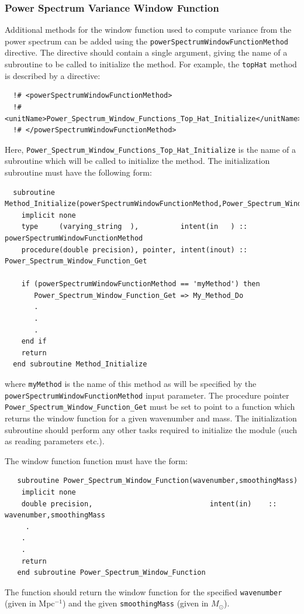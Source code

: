 \subsubsection{Power Spectrum Variance Window Function}

Additional methods for the window function used to compute variance from the power spectrum can be added using the {\tt powerSpectrumWindowFunctionMethod} directive. The directive should contain a single argument, giving the name of a subroutine to be called to initialize the method. For example, the {\tt topHat} method is described by a directive:
\begin{verbatim}
  !# <powerSpectrumWindowFunctionMethod>
  !#  <unitName>Power_Spectrum_Window_Functions_Top_Hat_Initialize</unitName>
  !# </powerSpectrumWindowFunctionMethod>
\end{verbatim}
Here, {\tt Power\_Spectrum\_Window\_Functions\_Top\_Hat\_Initialize} is the name of a subroutine which will be called to initialize the method. The initialization subroutine must have the following form:
\begin{verbatim}
  subroutine Method_Initialize(powerSpectrumWindowFunctionMethod,Power_Spectrum_Window_Function_Get)
    implicit none
    type     (varying_string  ),          intent(in   ) :: powerSpectrumWindowFunctionMethod
    procedure(double precision), pointer, intent(inout) :: Power_Spectrum_Window_Function_Get
    
    if (powerSpectrumWindowFunctionMethod == 'myMethod') then
       Power_Spectrum_Window_Function_Get => My_Method_Do
       .
       .
       .
    end if
    return
  end subroutine Method_Initialize
\end{verbatim}
where {\tt myMethod} is the name of this method as will be specified by the {\tt powerSpectrumWindowFunctionMethod} input parameter. The procedure pointer {\tt Power\_Spectrum\_Window\_Function\_Get} must be set to point to a function which returns the window function for a given wavenumber and mass. The initialization subroutine should perform any other tasks required to initialize the module (such as reading parameters etc.).

The window function function must have the form:
\begin{verbatim}
   subroutine Power_Spectrum_Window_Function(wavenumber,smoothingMass)
    implicit none
    double precision,                            intent(in)    :: wavenumber,smoothingMass
     .
    .
    .
    return
   end subroutine Power_Spectrum_Window_Function
\end{verbatim}
The function should return the window function for the specified {\tt wavenumber} (given in Mpc$^{-1}$) and the given {\tt smoothingMass} (given in $M_\odot$).

